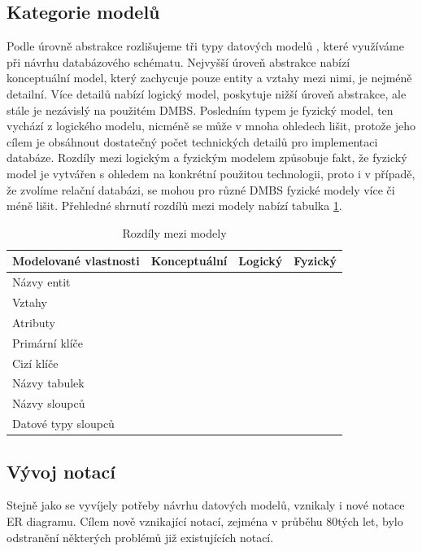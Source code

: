 \documentclass[czech,bachelor,public,dept460,male,oneside]{diploma}
\newcommand{\xmark}{\ding{55}}
\newcommand{\cmark}{\ding{51}}
\begin{document}
	\subsection{Kategorie modelů}
	Podle úrovně abstrakce rozlišujeme tři typy datových modelů \cite{whatIsERD}, které využíváme při návrhu databázového schématu. Nejvyšší úroveň abstrakce nabízí konceptuální model, který zachycuje pouze entity a vztahy mezi nimi, je nejméně detailní. Více detailů nabízí logický model, poskytuje nižší úroveň abstrakce, ale stále je nezávislý na použitém DMBS. Posledním typem je fyzický model, ten vychází z logického modelu, nicméně se může v mnoha ohledech lišit, protože jeho cílem je obsáhnout dostatečný počet technických detailů pro implementaci databáze. Rozdíly mezi logickým a fyzickým modelem způsobuje fakt, že fyzický model je vytvářen s ohledem na konkrétní použitou technologii, proto i v případě, že zvolíme relační databázi, se mohou pro různé DMBS fyzické modely více či méně lišit. Přehledné shrnutí rozdílů mezi modely nabízí tabulka \ref{tab:modelTypes}.
	
	\begin{table}[!h]
		\centering
		\caption{Rozdíly mezi modely}
		\label{tab:modelTypes}
		\begin{tabular}{l c c c}
			\toprule
			Modelované vlastnosti & Konceptuální & Logický & Fyzický \\
			\midrule
			Názvy entit & \cmark & \cmark & \xmark \\
			Vztahy & \cmark& \cmark & \xmark \\
			Atributy & \cmark& \cmark & \xmark \\
			Primární klíče & \xmark & \cmark & \cmark \\
			Cizí klíče & \xmark & \cmark & \cmark \\
			Názvy tabulek & \xmark & \xmark & \cmark \\
			Názvy sloupců & \xmark & \xmark & \cmark \\
			Datové typy sloupců & \xmark & \xmark & \cmark \\
			\midrule
		\end{tabular}
	\end{table}
	
	
	\subsection{Vývoj notací}
	Stejně jako se vyvíjely potřeby návrhu datových modelů, vznikaly i nové notace ER diagramu. Cílem nově vznikající notací, zejména v průběhu 80tých let, bylo odstranění některých problémů již existujících notací. 
	
\end{document}
